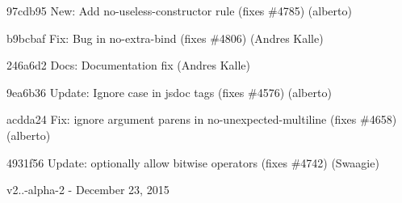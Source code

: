 \begin{DoxyItemize}
\item 97cdb95 New\+: Add no-\/useless-\/constructor rule (fixes \#4785) (alberto)
\item b9bcbaf Fix\+: Bug in no-\/extra-\/bind (fixes \#4806) (Andres Kalle)
\item 246a6d2 Docs\+: Documentation fix (Andres Kalle)
\item 9ea6b36 Update\+: Ignore case in jsdoc tags (fixes \#4576) (alberto)
\item acdda24 Fix\+: ignore argument parens in no-\/unexpected-\/multiline (fixes \#4658) (alberto)
\item 4931f56 Update\+: optionally allow bitwise operators (fixes \#4742) (Swaagie)
\end{DoxyItemize}

v2..-\/alpha-\/2 -\/ December 23, 2015


